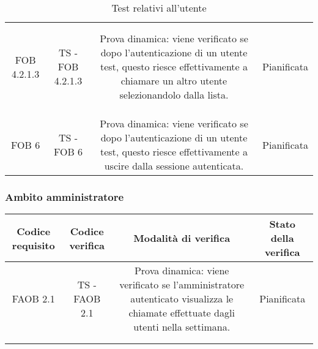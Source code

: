{{\begin{table}[h!]
\begin{center}
\begin{minipage}{1\linewidth}
\begin{tabular}{c c c c}
						\bottomrule
						\\\\
						FOB 4.2.1.3
						&
						TS - FOB 4.2.1.3			
						& 
						\begin{minipage}{0.55\linewidth}
							Prova dinamica: viene verificato se dopo l'autenticazione di un
							utente test, questo riesce effettivamente a chiamare un altro
							utente selezionandolo dalla lista.
						\end{minipage}	
						&
						Pianificata
						\\
						\\
						\bottomrule
						\\\\
						FOB 6
						&
						TS - FOB 6 			
						& 
						\begin{minipage}{0.55\linewidth}
							Prova dinamica: viene verificato se dopo l'autenticazione di un
							utente test, questo riesce effettivamente a uscire dalla
							sessione autenticata.
						\end{minipage}	
						&
						Pianificata
						
						\\  
						\bottomrule
						\end{tabular}
					\end{minipage}
				
			\end{center}	
			\caption{Test relativi all'utente}
		\end{table}
	}
	
	\newpage
	\subsubsection{Ambito amministratore}{
		\begin{table}[h!]
			\begin{center}
			\scriptsize
					\begin{minipage}{1\linewidth}
						\begin{tabular}{c c c c}				
						\toprule
							Codice requisito& Codice verifica & Modalità di verifica & Stato della verifica \\ 
						\midrule	
						
						FAOB 2.1
						&
						TS - FAOB 2.1	
						& 
						\begin{minipage}{0.55\linewidth}
							Prova dinamica: viene verificato se l'amministratore
							autenticato visualizza le chiamate effettuate dagli utenti
							nella settimana.
						\end{minipage}	
						&
						Pianificata
						\\
						\\
						\bottomrule
						\\
						

\end{tabular}
\end{minipage}
\end{center}
\end{table}}}
